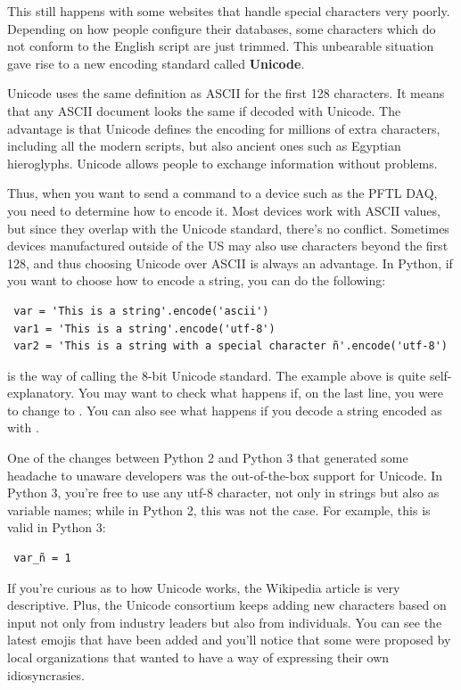 This still happens with some websites that handle special characters very poorly. Depending on how people configure their databases, some characters which do not conform to the English script are just trimmed. This unbearable situation gave rise to a new encoding standard called \textbf{Unicode}.

Unicode uses the same definition as ASCII for the first 128 characters. It means that any ASCII document looks the same if decoded with Unicode. The advantage is that Unicode defines the encoding for millions of extra characters, including all the modern scripts, but also ancient ones such as Egyptian hieroglyphs. Unicode allows people to exchange information without problems.

Thus, when you want to send a command to a device such as the {PFTL DAQ}, you need to determine how to encode it. Most devices work with ASCII values, but since they overlap with the Unicode standard, there's no conflict. Sometimes devices manufactured outside of the US may also use characters beyond the first 128, and thus choosing Unicode over ASCII is always an advantage. In Python, if you want to choose how to encode a string, you can do the following:

\begin{verbatim}
 var = 'This is a string'.encode('ascii')
 var1 = 'This is a string'.encode('utf-8')
 var2 = 'This is a string with a special character ñ'.encode('utf-8')
\end{verbatim}

 is the way of calling the 8-bit Unicode standard. The example above is quite self-explanatory. You may want to check what happens if, on the last line, you were to change  to . You can also see what happens if you decode a string encoded as  with .

One of the changes between Python 2 and Python 3 that generated some headache to unaware developers was the out-of-the-box support for Unicode. In Python 3, you're free to use any utf-8 character, not only in strings but also as variable names; while in Python 2, this was not the case. For example, this is valid in Python 3:

\begin{verbatim}
 var_ñ = 1
\end{verbatim}

If you're curious as to how Unicode works, the Wikipedia article is very descriptive. Plus, the Unicode consortium keeps adding new characters based on input not only from industry leaders but also from individuals. You can see the latest emojis that have been added and you'll notice that some were proposed by local organizations that wanted to have a way of expressing their own idiosyncrasies.
